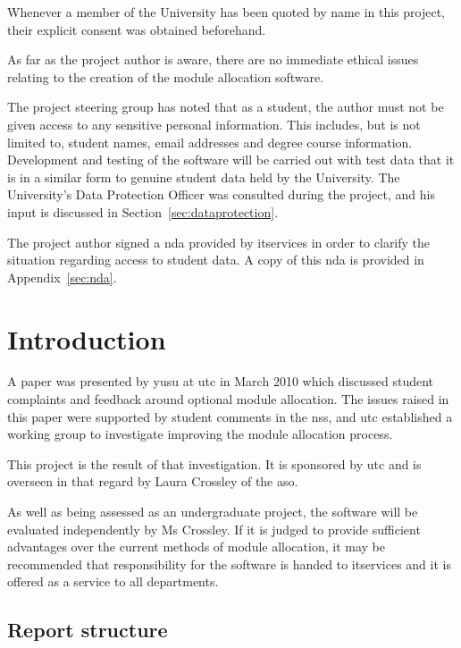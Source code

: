 \documentclass[draft]{scrartcl}
\begin{document}
Whenever a member of the University has been quoted by name in this project,
their explicit consent was obtained beforehand.


As far as the project author is aware, there are no immediate ethical issues
relating to the creation of the module allocation software.


The project steering group has noted that as a student, the author must not be
given access to any sensitive personal information. This includes, but is not
limited to, student names, email addresses and degree course information.
Development and testing of the software will be carried out with test data
that it is in a similar form to genuine student data held by the University.
The University's Data Protection Officer was consulted during the project, and
his input is discussed in Section~\ref{sec:dataprotection}.

The project author signed a \gls{nda} provided by \gls{itservices} in order to
clarify the situation regarding access to student data. A copy of this
\gls{nda} is provided in Appendix~\ref{sec:nda}.

\section{Introduction}


A paper was presented by \gls{yusu} at \gls{utc} in March 2010 which discussed
student complaints and feedback around optional module allocation. The issues
raised in this paper were supported by student comments in the \gls{nss}, and
\gls{utc} established a working group to investigate improving the module
allocation process.

This project is the result of that investigation. It is sponsored by \gls{utc}
and is overseen in that regard by Laura Crossley of the \gls{aso}.

As well as being assessed as an undergraduate project, the software will be
evaluated independently by Ms Crossley. If it is judged to provide sufficient
advantages over the current methods of module allocation, it may be
recommended that responsibility for the software is handed to
\gls{itservices} and it is offered as a service to all departments.

\subsection{Report structure}
\end{document}

